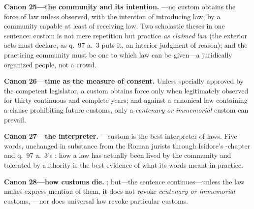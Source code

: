\textbf{Canon 25---the community and its intention.} ---no custom obtains the force of law unless observed, with the intention of introducing law, by a community capable at least of receiving law. Two scholastic theses in one sentence: custom is not mere repetition but practice \emph{as claimed law} (the exterior acts must declare, as q.~97 a.~3 puts it, an interior judgment of reason); and the practicing community must be one to which law can be given---a juridically organized people, not a crowd.

\textbf{Canon 26---time as the measure of consent.} Unless specially approved by the competent legislator, a custom  obtains force only when legitimately observed for thirty continuous and complete years; and against a canonical law containing a clause prohibiting future customs, only a \emph{centenary or immemorial} custom can prevail.

\textbf{Canon 27---the interpreter.} ---custom is the best interpreter of laws. Five words, unchanged in substance from the Roman jurists through Isidore's -chapter and q.~97 a.~3's : how a law has actually been lived by the community and tolerated by authority is the best evidence of what its words meant in practice.

\textbf{Canon 28---how customs die.} ; but---the sentence continues---unless the law makes express mention of them, it does not revoke \emph{centenary or immemorial} customs, ---nor does universal law revoke particular customs.

